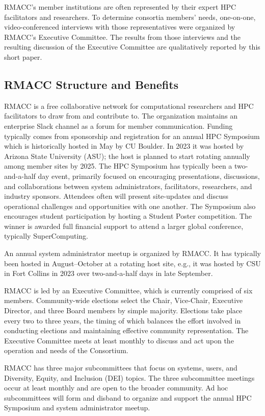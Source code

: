 \documentclass[sigconf]{acmart}
\theoremstyle{plain}
\begin{document}
RMACC's member institutions are often represented by their expert HPC
facilitators and researchers. To determine consortia members' needs, 
one-on-one, video-conferenced interviews with those representatives were
organized by RMACC's Executive Committee. The results from those
interviews and the resulting discussion of the Executive Committee are
qualitatively reported by this short paper.

\subsection{RMACC Structure and Benefits}
RMACC is a free collaborative network for computational researchers and
HPC facilitators to draw from and contribute to. The organization
maintains an enterprise Slack channel as a forum for member
communication. Funding typically comes from sponsorship and registration
for an annual HPC Symposium which is historically hosted in May by CU
Boulder. In 2023 it was hosted by Arizona State University (ASU); the
host is planned to start rotating annually among member sites by 2025.
The HPC Symposium has typically been a two-and-a-half day event,
primarily focused on encouraging presentations, discussions, and
collaborations between system administrators, facilitators, researchers,
and industry sponsors.  Attendees often will present site-updates and
discuss operational challenges and opportunities with one another. The
Symposium also encourages student participation by hosting a Student
Poster competition. The winner is awarded full financial support to
attend a larger global conference, typically SuperComputing. 

An annual system administrator meetup is organized by RMACC. It has
typically been hosted in August--October at a rotating host site, e.g.,
it was hosted by CSU in Fort Collins in 2023 over two-and-a-half days in
late September. 

RMACC is led by an Executive Committee, which is currently comprised of
six members. Community-wide elections select the Chair, Vice-Chair,
Executive Director, and three Board members by simple majority.
Elections take place every two to three years, the timing of which
balances the effort involved in conducting elections and maintaining
effective community representation. The Executive Committee meets at
least monthly to discuss and act upon the operation and needs of the
Consortium.

RMACC has three major subcommittees that focus on systems, users, and
Diversity, Equity, and Inclusion (DEI) topics. The three subcommittee
meetings occur at least monthly and are open to the broader community.
Ad hoc subcommittees will form and disband to organize and support the
annual HPC Symposium and system administrator meetup.
\end{document}

